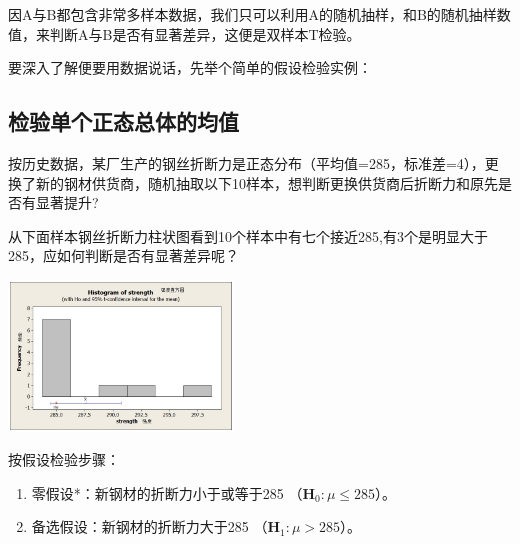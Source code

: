因A与B都包含非常多样本数据，我们只可以利用A的随机抽样，和B的随机抽样数值，来判断A与B是否有显著差异，这便是双样本T检验。

要深入了解便要用数据说话，先举个简单的假设检验实例：

\hypertarget{ux68c0ux9a8cux5355ux4e2aux6b63ux6001ux603bux4f53ux7684ux5747ux503c}{%
\subsection{检验单个正态总体的均值}\label{ux68c0ux9a8cux5355ux4e2aux6b63ux6001ux603bux4f53ux7684ux5747ux503c}}

按历史数据，某厂生产的钢丝折断力是正态分布（平均值=285，标准差=4），更换了新的钢材供货商，随机抽取以下10样本，想判断更换供货商后折断力和原先是否有显著提升?

\begin{description}
\item[]
\end{description}

从下面样本钢丝折断力柱状图看到10个样本中有七个接近285,有3个是明显大于285，应如何判断是否有显著差异呢？


\includegraphics[width=6cm]{1sigmaUnknownHistogram_of_strength-1.jpg}

按假设检验步骤：

\begin{enumerate}
\tightlist
\item
  零假设*：新钢材的折断力小于或等于285
  （\(\mathbf{H}_0: \mu \le 285\)）。
\item
  备选假设：新钢材的折断力大于285 （\(\mathbf{H}_1: \mu > 285\)）。
\end{enumerate}

\begin{description}
\item[]
\end{description}


